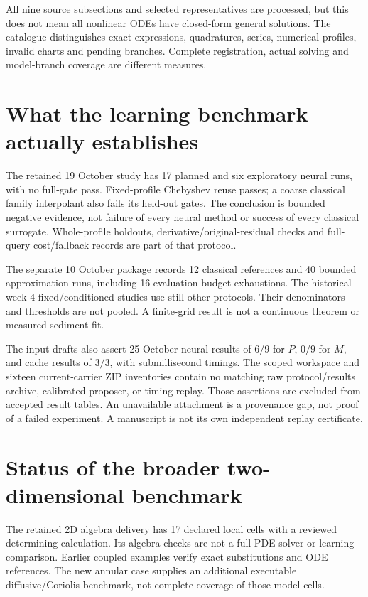 \documentclass[11pt,a4paper,oneside]{report}
\numberwithin{equation}{chapter}
\begin{document}
All nine source subsections and selected representatives are processed, but
this does not mean all nonlinear ODEs have closed-form general solutions.
The catalogue distinguishes exact expressions, quadratures, series,
numerical profiles, invalid charts and pending branches.
Complete registration, actual solving and model-branch coverage are
different measures.

\section{What the learning benchmark actually establishes}
The retained 19 October study has 17 planned and six exploratory neural
runs, with no full-gate pass. Fixed-profile Chebyshev reuse passes;
a coarse classical family interpolant also fails its held-out gates.
The conclusion is bounded negative evidence, not failure of every neural
method or success of every classical surrogate.
Whole-profile holdouts, derivative/original-residual checks and full-query
cost/fallback records are part of that protocol.

The separate 10 October package records 12 classical references and 40
bounded approximation runs, including 16 evaluation-budget exhaustions.
The historical week-4 fixed/conditioned studies use still other protocols.
Their denominators and thresholds are not pooled.
A finite-grid result is not a continuous theorem or measured sediment fit.

The input drafts also assert 25 October neural results of $6/9$ for $P$,
$0/9$ for $M$, and cache results of $3/3$, with submillisecond timings.
The scoped workspace and sixteen current-carrier ZIP inventories contain
no matching raw protocol/results archive, calibrated proposer, or timing
replay. Those assertions are excluded from accepted result tables.
An unavailable attachment is a provenance gap, not proof of a failed
experiment. A manuscript is not its own independent replay certificate.

\section{Status of the broader two-dimensional benchmark}
The retained 2D algebra delivery has 17 declared local cells with a reviewed
determining calculation. Its algebra checks are not a full PDE-solver or
learning comparison. Earlier coupled examples verify exact substitutions
and ODE references. The new annular case supplies an additional executable
diffusive/Coriolis benchmark, not complete coverage of those model cells.
\end{document}

